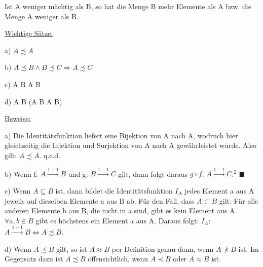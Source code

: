 \documentclass[12pt]{article}
\begin{document}
		\bigskip
		
		
		Ist A weniger mächtig als B, so hat die Menge B mehr Elemente als A bzw. die Menge A weniger als B.
		
		\underline{Wichtige Sätze:}
		
		{
			\begin{singlespace}
				a) $A \precsim A$
				
				b) $A \precsim B \land B \precsim C \Rightarrow A \precsim C$
				
				c) A \subseteq B \Rightarrow A \precsim B
				
				d) A \precsim B \Leftrightarrow (A \prec B \lor A \approx B)
			\end{singlespace}
		}
		
		\underline{Beweise:}
		
		a) Die Identitätsfunktion liefert eine Bijektion von A nach A, 
		wodruch hier gleichzeitig die Injektion und Surjektion von A nach A 
		gewährleistet wurde. Also gilt: $A \precsim A$. \hspace*{2mm} q.e.d.
		
		b) Wenn f: $A \xrightarrow{1-1} B$ und g: $B \xrightarrow{1-1} C$ gilt, dann folgt daraus
		$g \circ f$: $A \xrightarrow{1-1} C$.$^2$ $\blacksquare$
		
		c) Wenn $A \subseteq B$ ist, dann bildet die Identitätsfunktion $I_A$ jedes Element a aus A 
		jeweils auf dieselben Elemente a aus B ab. Für den Fall, dass $A \subset B$ gilt: 
		Für alle anderen Elemente b aus B, die nicht in a sind, gibt es kein Element aus A.
		$\forall a, b \in B$ gibt es höchstens ein Element a aus A.
		Daraus folgt: $I_A$: $A \xrightarrow{1-1} B \Leftrightarrow A \precsim B$.
		
		d) Wenn $A \precsim B$ gilt, so ist $A \approx B$ per Definition genau dann, wenn $A \not \prec B$ ist.
		Im Gegensatz dazu ist $A \precsim B$ offensichtlich, wenn $A \prec B$ oder $A \approx B$ ist.
		
\end{document}
